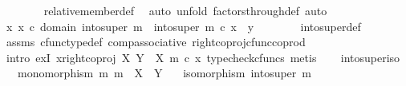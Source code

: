 \begin{isabellebody}
\ \ \ \ \ \ \isamarkupfalse%
\ relative{\isacharunderscore}{\kern0pt}member{\isacharunderscore}{\kern0pt}def{}\ \isamarkupfalse%
\ {\isacharparenleft}{\kern0pt}auto{\isacharcomma}{\kern0pt}\ unfold\ factors{\isacharunderscore}{\kern0pt}through{\isacharunderscore}{\kern0pt}def{}{\isacharcomma}{\kern0pt}\ auto{\isacharparenright}{\kern0pt}\isanewline
\ \ \ \ \isamarkupfalse%
\ \isamarkupfalse%
\ {\isachardoublequoteopen}{\isasymexists}x{\isachardot}{\kern0pt}\ x\ {\isasymin}\isactrlsub c\ domain\ {\isacharparenleft}{\kern0pt}into{\isacharunderscore}{\kern0pt}super\ m{\isacharparenright}{\kern0pt}\ {\isasymand}\ into{\isacharunderscore}{\kern0pt}super\ m\ {\isasymcirc}\isactrlsub c\ x\ {\isacharequal}{\kern0pt}\ y{\isachardoublequoteclose}\isanewline
\ \ \ \ \ \ \isamarkupfalse%
\ into{\isacharunderscore}{\kern0pt}super{\isacharunderscore}{\kern0pt}def\ \isamarkupfalse%
\ assms\ cfunc{\isacharunderscore}{\kern0pt}type{\isacharunderscore}{\kern0pt}def\ comp{\isacharunderscore}{\kern0pt}associative\ right{\isacharunderscore}{\kern0pt}coproj{\isacharunderscore}{\kern0pt}cfunc{\isacharunderscore}{\kern0pt}coprod\isanewline
\ \ \ \ \ \ \isamarkupfalse%
\ {\isacharparenleft}{\kern0pt}intro\ exI{\isacharbrackleft}{\kern0pt}\ x{\isacharequal}{\kern0pt}{\isachardoublequoteopen}right{\isacharunderscore}{\kern0pt}coproj\ X\ {\isacharparenleft}{\kern0pt}Y\ {\isasymsetminus}\ {\isacharparenleft}{\kern0pt}X{\isacharcomma}{\kern0pt}\ m{\isacharparenright}{\kern0pt}{\isacharparenright}{\kern0pt}\ {\isasymcirc}\isactrlsub c\ x{\isacharprime}{\kern0pt}{\isachardoublequoteclose}{\isacharbrackright}{\kern0pt}{\isacharcomma}{\kern0pt}\ typecheck{\isacharunderscore}{\kern0pt}cfuncs{\isacharcomma}{\kern0pt}\ metis{\isacharparenright}{\kern0pt}\isanewline
\ \ \isamarkupfalse%
\isanewline
{}\isamarkupfalse%
%
\endisatagproof
{\isafoldproof}%
%
\isadelimproof
\isanewline
%
\endisadelimproof
\isanewline
{}\isamarkupfalse%
\ into{\isacharunderscore}{\kern0pt}super{\isacharunderscore}{\kern0pt}iso{\isacharcolon}{\kern0pt}\isanewline
\ \ \ {\isachardoublequoteopen}monomorphism\ m{\isachardoublequoteclose}\ {\isachardoublequoteopen}m\ {\isacharcolon}{\kern0pt}\ X\ {\isasymrightarrow}\ Y{\isachardoublequoteclose}\isanewline
\ \ \ {\isachardoublequoteopen}isomorphism\ {\isacharparenleft}{\kern0pt}into{\isacharunderscore}{\kern0pt}super\ m{\isacharparenright}{\kern0pt}{\isachardoublequoteclose}\isanewline

\end{isabellebody}
